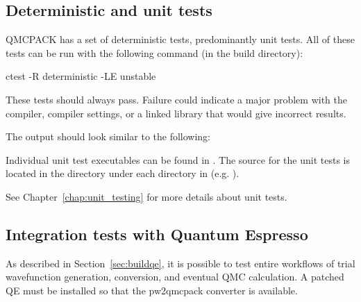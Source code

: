 \subsection{Deterministic and unit tests}

QMCPACK has a set of deterministic tests, predominantly unit tests.
All of these tests can be run with the following command (in the build directory):

\begin{shade}
ctest -R deterministic -LE unstable
\end{shade}

These tests should always pass. Failure could indicate a major problem
with the compiler, compiler settings, or a linked library that would
give incorrect results.

The output should look similar to the following:


Individual unit test executables can be found in .
The source for the unit tests is located in the  directory under each directory in  (e.g. ).

See Chapter~\ref{chap:unit_testing} for more details about unit tests.

\subsection{Integration tests with Quantum Espresso}
\label{sec:integtestqe}
As described in Section~\ref{sec:buildqe}, it is possible to test entire
workflows of trial wavefunction generation, conversion, and eventual
QMC calculation. A patched QE must be installed so that the
pw2qmcpack converter is available.

